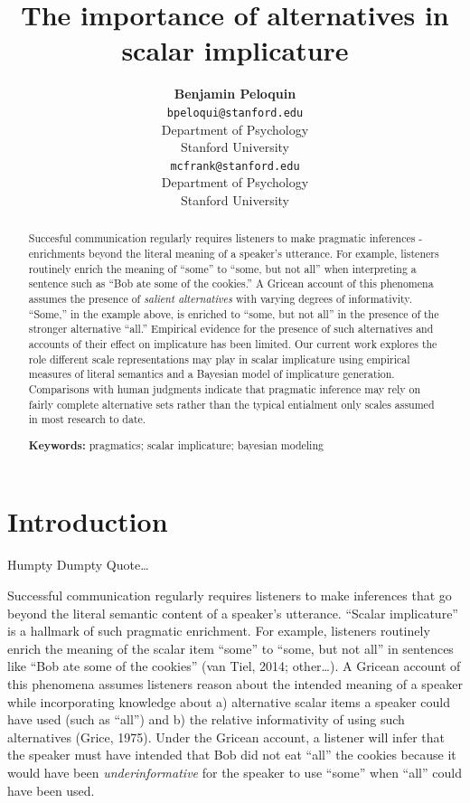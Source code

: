 \documentclass[10pt, letterpaper]{article}
\title{The importance of alternatives in scalar implicature}
\author{{\large \bf Benjamin Peloquin} \\ \texttt{bpeloqui@stanford.edu} \\ Department of Psychology \\ Stanford University \And {\large \bf Michael C. Frank} \\ \texttt{mcfrank@stanford.edu} \\ Department of Psychology \\ Stanford University}
\begin{document}
\maketitle

\begin{abstract}
Succesful communication regularly requires listeners to make pragmatic
inferences - enrichments beyond the literal meaning of a speaker's
utterance. For example, listeners routinely enrich the meaning of
``some'' to ``some, but not all'' when interpreting a sentence such as
``Bob ate some of the cookies.'' A Gricean account of this phenomena
assumes the presence of \emph{salient alternatives} with varying degrees
of informativity. ``Some,'' in the example above, is enriched to ``some,
but not all'' in the presence of the stronger alternative ``all.''
Empirical evidence for the presence of such alternatives and accounts of
their effect on implicature has been limited. Our current work explores
the role different scale representations may play in scalar implicature
using empirical measures of literal semantics and a Bayesian model of
implicature generation. Comparisons with human judgments indicate that
pragmatic inference may rely on fairly complete alternative sets rather
than the typical entialment only scales assumed in most research to
date.

\textbf{Keywords:}
pragmatics; scalar implicature; bayesian modeling
\end{abstract}

\section{Introduction}\label{introduction}

Humpty Dumpty Quote\ldots{}

Successful communication regularly requires listeners to make inferences
that go beyond the literal semantic content of a speaker's utterance.
``Scalar implicature'' is a hallmark of such pragmatic enrichment. For
example, listeners routinely enrich the meaning of the scalar item
``some'' to ``some, but not all'' in sentences like ``Bob ate some of
the cookies'' (van Tiel, 2014; other\ldots{}). A Gricean account of this
phenomena assumes listeners reason about the intended meaning of a
speaker while incorporating knowledge about a) alternative scalar items
a speaker could have used (such as ``all'') and b) the relative
informativity of using such alternatives (Grice, 1975). Under the
Gricean account, a listener will infer that the speaker must have
intended that Bob did not eat ``all'' the cookies because it would have
been \emph{underinformative} for the speaker to use ``some'' when
``all'' could have been used.
\end{document}
